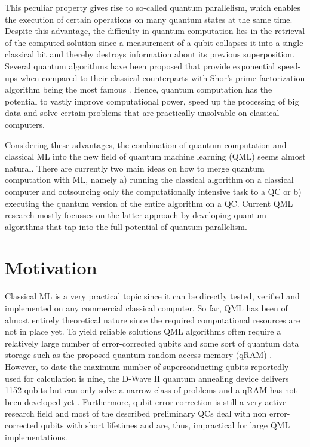 This peculiar property gives rise to so-called quantum parallelism, which enables the execution of certain operations on many quantum states at the same time. Despite this advantage, the difficulty in quantum computation lies in the retrieval of the computed solution since a measurement of a qubit collapses it into a single classical bit and thereby destroys information about its previous superposition. Several quantum algorithms have been proposed that provide exponential speed-ups when compared to their classical counterparts with Shor's prime factorization algorithm being the most famous \cite{shor1994}.
Hence, quantum computation has the potential to vastly improve computational power, speed up the processing of big data and solve certain problems that are practically unsolvable on classical computers. 


Considering these advantages, the combination of quantum computation and classical ML into the new field of quantum machine learning (QML) seems almost natural. There are currently two main ideas on how to merge quantum computation with ML, namely a) running the classical algorithm on a classical computer and outsourcing only the computationally intensive task to a QC or b) executing the quantum version of the entire algorithm on a QC. Current QML research mostly focusses on the latter approach by developing quantum algorithms that tap into the full potential of quantum parallelism.

\section{Motivation}
\label{sec:motivation}

Classical ML is a very practical topic since it can be directly tested, verified and implemented on any commercial classical computer. So far, QML has been of almost entirely theoretical nature since the required computational resources are not in place yet. To yield reliable solutions QML algorithms often require a relatively large number of error-corrected qubits and some sort of quantum data storage such as the proposed quantum random access memory (qRAM) \cite{qRAM}. However, to date the maximum number of superconducting qubits reportedly used for calculation is nine, the D-Wave II quantum annealing device delivers 1152 qubits but can only solve a narrow class of problems and a qRAM has not been developed yet \cite{hydrogensimulation, dwave2}. Furthermore, qubit error-correction is still a very active research field and most of the described preliminary QCs deal with non error-corrected qubits with short lifetimes and are, thus, impractical for large QML implementations.

